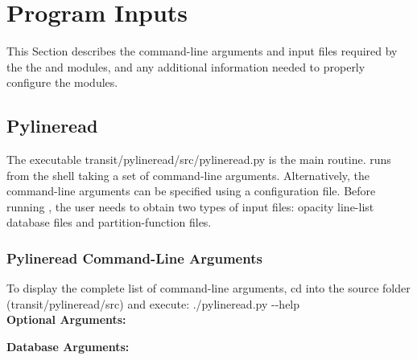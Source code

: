 \documentclass[letterpaper, 12pt]{article}
\begin{document}
\section{Program Inputs}
\label{sec:inputs}

This Section describes the command-line arguments and input files
required by the the {\pylineread} and {\transit} modules, and any
additional information needed to properly configure the modules.

\subsection{Pylineread}
\label{sec:inp-pyline}

The executable {\tttm transit/pylineread/src/pylineread.py} is the
main {\pylineread} routine.  {\pylineread} runs from the shell taking a
set of command-line arguments.  Alternatively, the command-line
arguments can be specified using a configuration file.  
Before running {\pylineread}, the user needs to obtain two types of
input files: opacity line-list database files and partition-function files.

\subsubsection{Pylineread Command-Line Arguments}

To display the complete list of command-line arguments, cd into the
{\pylineread} source folder ({\tttm transit/pylineread/src}) and
execute: \newline
{\tttb ./pylineread.py {-}{-}help} \\

{\bf Optional Arguments:} \newline
{}




{\bf Database Arguments:} \newline
{}

\end{document}
